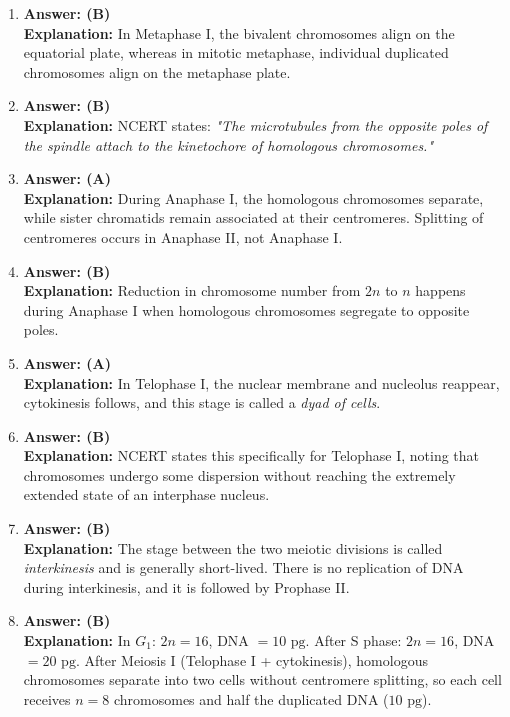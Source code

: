 \documentclass[11pt,a4paper]{article}
\begin{document}
\begin{enumerate}[label=\textbf{\arabic*.}]
\item \textbf{Answer: (B)}\\
\textbf{Explanation:} In Metaphase I, the bivalent chromosomes align on the equatorial plate, whereas in mitotic metaphase, individual duplicated chromosomes align on the metaphase plate.

\item \textbf{Answer: (B)}\\
\textbf{Explanation:} NCERT states: \textit{"The microtubules from the opposite poles of the spindle attach to the kinetochore of homologous chromosomes."}

\item \textbf{Answer: (A)}\\
\textbf{Explanation:} During Anaphase I, the homologous chromosomes separate, while sister chromatids remain associated at their centromeres. Splitting of centromeres occurs in Anaphase II, not Anaphase I.

\item \textbf{Answer: (B)}\\
\textbf{Explanation:} Reduction in chromosome number from $2n$ to $n$ happens during Anaphase I when homologous chromosomes segregate to opposite poles.

\item \textbf{Answer: (A)}\\
\textbf{Explanation:} In Telophase I, the nuclear membrane and nucleolus reappear, cytokinesis follows, and this stage is called a \textit{dyad of cells}.

\item \textbf{Answer: (B)}\\
\textbf{Explanation:} NCERT states this specifically for Telophase I, noting that chromosomes undergo some dispersion without reaching the extremely extended state of an interphase nucleus.

\item \textbf{Answer: (B)}\\
\textbf{Explanation:} The stage between the two meiotic divisions is called \textit{interkinesis} and is generally short-lived. There is no replication of DNA during interkinesis, and it is followed by Prophase II.

\item \textbf{Answer: (B)}\\
\textbf{Explanation:} In $G_1$: $2n = 16$, DNA $= 10\text{ pg}$. After S phase: $2n = 16$, DNA $= 20\text{ pg}$. After Meiosis I (Telophase I + cytokinesis), homologous chromosomes separate into two cells without centromere splitting, so each cell receives $n = 8$ chromosomes and half the duplicated DNA ($10\text{ pg}$).


\end{enumerate}
\end{document}
